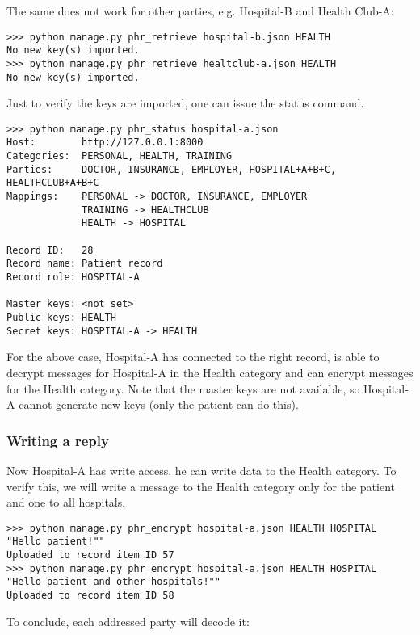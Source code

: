 \documentclass[a4paper]{article}
\begin{document}
			The same does not work for other parties, e.g. Hospital-B and Health Club-A:
		
			\begin{lstlisting}
>>> python manage.py phr_retrieve hospital-b.json HEALTH
No new key(s) imported.
>>> python manage.py phr_retrieve healtclub-a.json HEALTH
No new key(s) imported.
			\end{lstlisting}
		
			Just to verify the keys are imported, one can issue the status command.
			
			\begin{lstlisting}
>>> python manage.py phr_status hospital-a.json
Host:        http://127.0.0.1:8000
Categories:  PERSONAL, HEALTH, TRAINING
Parties:     DOCTOR, INSURANCE, EMPLOYER, HOSPITAL+A+B+C, HEALTHCLUB+A+B+C
Mappings:    PERSONAL -> DOCTOR, INSURANCE, EMPLOYER
             TRAINING -> HEALTHCLUB
             HEALTH -> HOSPITAL

Record ID:   28
Record name: Patient record
Record role: HOSPITAL-A

Master keys: <not set>
Public keys: HEALTH
Secret keys: HOSPITAL-A -> HEALTH
			\end{lstlisting}
			
			For the above case, Hospital-A has connected to the right record, is able to decrypt messages for Hospital-A in the Health category and can encrypt messages for the Health category. Note that the master keys are not available, so Hospital-A cannot generate new keys (only the patient can do this).
		
		\subsubsection{Writing a reply}\label{sec:usecase_7}
			Now Hospital-A has write access, he can write data to the Health category. To verify this, we will write a message to the Health category only for the patient and one to all hospitals.
			
			\begin{lstlisting}
>>> python manage.py phr_encrypt hospital-a.json HEALTH HOSPITAL "Hello patient!""
Uploaded to record item ID 57
>>> python manage.py phr_encrypt hospital-a.json HEALTH HOSPITAL "Hello patient and other hospitals!""
Uploaded to record item ID 58
			\end{lstlisting}
			
			To conclude, each addressed party will decode it:
\end{document}
